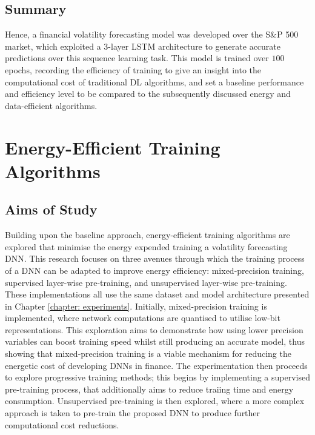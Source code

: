\documentclass[a4paper, 11pt]{report}
\begin{document}
    \section{Summary}

    Hence, a financial volatility forecasting model was developed over the S\&P 500 market, which exploited a 3-layer LSTM architecture to generate accurate predictions over this sequence learning task. This model is trained over $100$ epochs, recording the efficiency of training to give an insight into the computational cost of traditional DL algorithms, and set a baseline performance and efficiency level to be compared to the subsequently discussed energy and data-efficient algorithms.


    \chapter{Energy-Efficient Training Algorithms}
    \label{chapter: energy-extensions}

    \section{Aims of Study}

    Building upon the baseline approach, energy-efficient training algorithms are explored that minimise the energy expended training a volatility forecasting DNN. This research focuses on three avenues through which the training process of a DNN can be adapted to improve energy efficiency: mixed-precision training, supervised layer-wise pre-training, and unsupervised layer-wise pre-training. These implementations all use the same dataset and model architecture presented in Chapter \ref{chapter: experiments}. Initially, mixed-precision training is implemented, where network computations are quantised to utilise low-bit representations. This exploration aims to demonstrate how using lower precision variables can boost training speed whilst still producing an accurate model, thus showing that mixed-precision training is a viable mechanism for reducing the energetic cost of developing DNNs in finance. The experimentation then proceeds to explore progressive training methods; this begins by implementing a supervised pre-training process, that additionally aims to reduce traiing time and energy consumption. Unsupervised pre-training is then explored, where a more complex approach is taken to pre-train the proposed DNN to produce further computational cost reductions.
\end{document}
